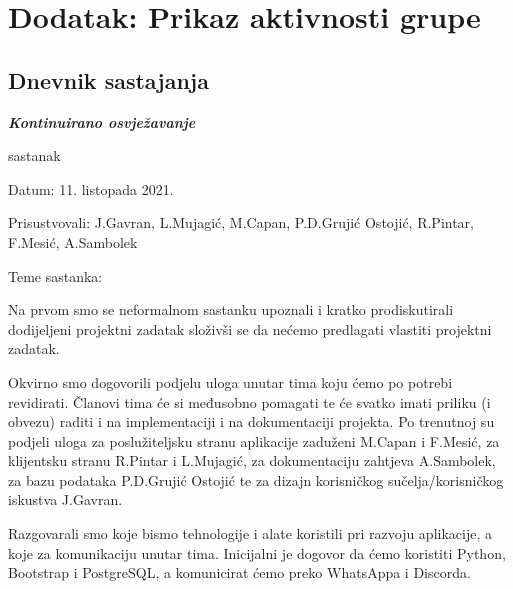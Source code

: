 \chapter*{Dodatak: Prikaz aktivnosti grupe}
		
		\section*{Dnevnik sastajanja}
		
		\textbf{\textit{Kontinuirano osvježavanje}}\\
	
		
		\begin{packed_enum}
			\item  sastanak
			
			\item[] \begin{packed_item}
				\item Datum: 11. listopada 2021.
				\item Prisustvovali: J.Gavran, L.Mujagić, M.Capan, P.D.Grujić Ostojić, R.Pintar, F.Mesić, A.Sambolek 
				\item Teme sastanka:
				\begin{packed_item}
					\item Na prvom smo se neformalnom sastanku upoznali i kratko prodiskutirali dodijeljeni projektni zadatak složivši se da nećemo predlagati vlastiti projektni zadatak.
					
					\item Okvirno smo dogovorili podjelu uloga unutar tima koju ćemo po potrebi revidirati. Članovi tima će si međusobno pomagati te će svatko imati priliku (i obvezu)
					raditi i na implementaciji i na dokumentaciji projekta. Po trenutnoj su podjeli uloga za poslužiteljsku stranu aplikacije zaduženi M.Capan i F.Mesić, za klijentsku
					stranu R.Pintar i L.Mujagić, za dokumentaciju zahtjeva A.Sambolek, za bazu podataka P.D.Grujić Ostojić te za dizajn korisničkog sučelja/korisničkog iskustva J.Gavran.
					
					\item Razgovarali smo koje bismo tehnologije i alate koristili pri razvoju aplikacije, a koje za komunikaciju unutar tima. Inicijalni je dogovor da ćemo koristiti Python,
					Bootstrap i PostgreSQL, a komunicirat ćemo preko WhatsAppa i Discorda.
				\end{packed_item}
			\end{packed_item}
			

\end{packed_enum}
